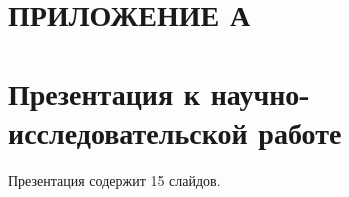\section*{\centering ПРИЛОЖЕНИЕ А}

\section*{Презентация к научно-исследовательской работе}
Презентация содержит 15 слайдов.